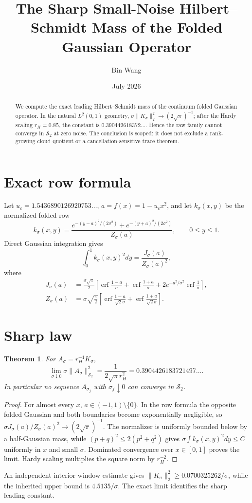 \documentclass[11pt]{article}
\title{The Sharp Small-Noise Hilbert--Schmidt Mass of the Folded Gaussian Operator}\author{Bin Wang}\date{July 2026}
\newtheorem{theorem}{Theorem}[section]\theoremstyle{remark}\newtheorem{remark}[theorem]{Remark}
\begin{document}
\maketitle
\begin{abstract}
We compute the exact leading Hilbert--Schmidt mass of the continuum folded
Gaussian operator.  In the natural $L^2(0,1)$ geometry,
$\sigma\|K_\sigma\|_2^2\to(2\sqrt\pi)^{-1}$; after the Hardy scaling
$r_H=0.85$, the constant is $0.390442618372\ldots$.  Hence the raw family
cannot converge in $\mathcal S_2$ at zero noise.  The conclusion is scoped:
it does not exclude a rank-growing cloud quotient or a cancellation-sensitive
trace theorem.
\end{abstract}
\section{Exact row formula}
Let $u_c=1.5436890126920753\ldots$, $a=f(x)=1-u_cx^2$, and let
$k_\sigma(x,y)$ be the normalized folded row
\[
 k_\sigma(x,y)=\frac{
 e^{-(y-a)^2/(2\sigma^2)}+e^{-(y+a)^2/(2\sigma^2)}}{Z_\sigma(a)},
 \qquad 0\le y\le1.
\]
Direct Gaussian integration gives
\[
 \int_0^1 k_\sigma(x,y)^2dy=\frac{J_\sigma(a)}{Z_\sigma(a)^2},
\]
where
\begin{align*}
J_\sigma(a)&=\frac{\sigma\sqrt\pi}{2}
\left[\operatorname{erf}\frac{1-a}{\sigma}
+\operatorname{erf}\frac{1+a}{\sigma}
+2e^{-a^2/\sigma^2}\operatorname{erf}\frac1\sigma\right],\\
Z_\sigma(a)&=\sigma\sqrt{\frac\pi2}
\left[\operatorname{erf}\frac{1-a}{\sqrt2\sigma}
+\operatorname{erf}\frac{1+a}{\sqrt2\sigma}\right].
\end{align*}
\section{Sharp law}
\begin{theorem}
For $A_\sigma=r_H^{-1}K_\sigma$,
\[
 \lim_{\sigma\downarrow0}\sigma\|A_\sigma\|_{\mathcal S_2}^2
 =\frac{1}{2\sqrt\pi r_H^2}=0.3904426183721497\ldots .
\]
In particular no sequence $A_{\sigma_j}$ with $\sigma_j\downarrow0$ can
converge in $\mathcal S_2$.
\end{theorem}
\begin{proof}
For almost every $x$, $a\in(-1,1)\setminus\{0\}$.  In the row formula the
opposite folded Gaussian and both boundaries become exponentially negligible,
so $\sigma J_\sigma(a)/Z_\sigma(a)^2\to(2\sqrt\pi)^{-1}$.
The normalizer is uniformly bounded below by a half-Gaussian mass, while
$(p+q)^2\le2(p^2+q^2)$ gives
$\sigma\int k_\sigma(x,y)^2dy\le C$ uniformly in $x$ and small $\sigma$.
Dominated convergence over $x\in[0,1]$ proves the limit.  Hardy scaling
multiplies the square norm by $r_H^{-2}$.
\end{proof}
An independent interior-window estimate gives
$\|K_\sigma\|_2^2\ge0.0700325262/\sigma$, while the inherited upper bound is
$4.5135/\sigma$.  The exact limit identifies the sharp leading constant.
\end{document}
